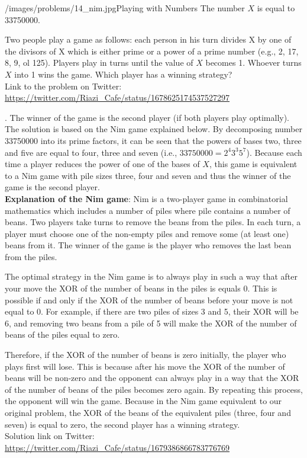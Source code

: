\begin{problem}{/images/problems/14_nim.jpg}{Playing with Numbers}
    The number $X$ is equal to 33750000.

Two people play a game as follows: each person in his turn divides X by one of the divisors of X which is either prime or a power of a prime number (e.g., 2, 17, 8, 9, ol 125). Players play in turns until the value of $X$ becomes 1. Whoever turns $X$ into 1 wins the game. Which player has a winning strategy? \\[0.2cm]

Link to the problem on Twitter:  \url{https://twitter.com/Riazi_Cafe/status/1678625174537527297}
\end{problem}
\begin{solution}.
The winner of the game is the second player (if both players play optimally).\\[0.2cm]

The solution is based on the Nim game explained below. By decomposing  number 33750000 into its prime factors, it can be seen that the powers of bases two, three and five are equal to four, three and seven (i.e., $33750000 = 2^4 3^3 5^7$). Because each time a player reduces the power of one of the bases of $X$, this game is equivalent to a Nim game with pile sizes  three, four and seven and thus the winner of the game is the second player.\\[0.2cm]

\textbf{Explanation of the Nim game}: Nim is a two-player game in combinatorial mathematics which includes a number of piles where pile contains a number of beans. Two players take turns to remove the beans from the piles. In each turn, a player must choose one of the non-empty piles and remove some (at least one) beans from it. The winner of the game is the player who removes the last bean from the piles.

The optimal strategy in the Nim game is to always play in such a way that after your move the XOR of the number of beans in the piles is equals 0. This is possible if  and only if the XOR of the number of beans before your move is not equal to 0. For example, if there are two piles of sizes 3 and 5, their XOR will be 6, and removing two beans from a pile of 5 will make the XOR of the number of beans of the piles equal to zero.

Therefore, if the XOR of the number of beans is zero initially, the player who plays first will lose. This is because after his move the XOR of the number of beans will be non-zero and the opponent can always play in a way that the XOR of the number of beans of the piles becomes zero again. By repeating this process, the opponent will win the game. Because in the Nim game equivalent to our original problem, the XOR of the beans of the equivalent piles (three, four and seven) is equal to zero,  the second player has a winning strategy.\\[0.2cm]


Solution link on Twitter:  \url{https://twitter.com/Riazi_Cafe/status/1679386866783776769}
\end{solution}